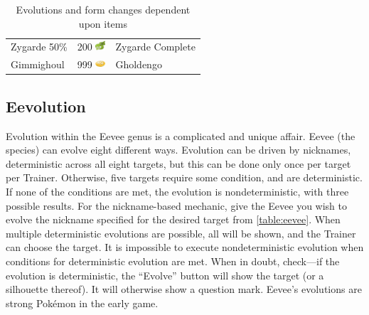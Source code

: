 \begin{table}
\begin{tabular}{lll}
    Zygarde 50\% & 200 \includegraphics[width=1em,height=1em]{images/zygardecell.png} & Zygarde Complete \\
    Gimmighoul & 999 \includegraphics[width=1em,height=1em]{images/gcoin.png} & Gholdengo \\
  \end{tabular}
  \caption{Evolutions and form changes dependent upon items\label{table:itemevolutions}}
\end{table}

\subsection{Eevolution}
\begin{figure}
\end{figure}
Evolution within the Eevee genus is a complicated and unique affair.
Eevee (the species) can evolve eight different ways.
Evolution can be driven by nicknames, deterministic across all eight targets,
  but this can be done only once per target per Trainer.
Otherwise, five targets require some condition, and are deterministic.
If none of the conditions are met, the evolution is nondeterministic,
  with three possible results.
For the nickname-based mechanic, give the Eevee you wish to evolve the nickname
  specified for the desired target from \autoref{table:eevee}.
When multiple deterministic evolutions are possible, all will be shown,
  and the Trainer can choose the target.
It is impossible to execute nondeterministic evolution when conditions for deterministic evolution are met.
When in doubt, check---if the evolution is deterministic, the ``Evolve'' button will show the target (or a silhouette thereof).
It will otherwise show a question mark.
Eevee's evolutions are strong Pokémon in the early game.
